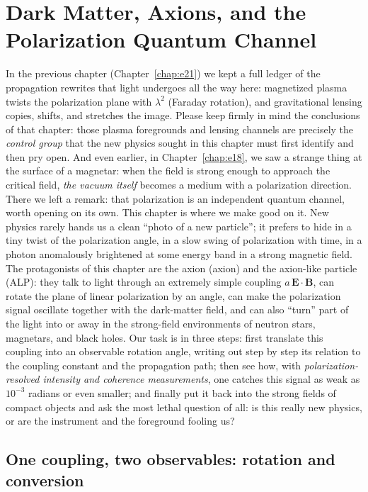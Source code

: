 \chapter{Dark Matter, Axions, and the Polarization Quantum Channel}
\label{chap:e22}

\begin{chapteropening}
In the previous chapter (Chapter~\ref{chap:e21}) we kept a full ledger of the propagation rewrites that light undergoes all the way here: magnetized plasma twists the polarization plane with \(\lambda^2\) (Faraday rotation), and gravitational lensing copies, shifts, and stretches the image. Please keep firmly in mind the conclusions of that chapter: those plasma foregrounds and lensing channels are precisely the \emph{control group} that the new physics sought in this chapter must first identify and then pry open. And even earlier, in Chapter~\ref{chap:e18}, we saw a strange thing at the surface of a magnetar: when the field is strong enough to approach the critical field, \emph{the vacuum itself} becomes a medium with a polarization direction. There we left a remark: that polarization is an independent quantum channel, worth opening on its own. This chapter is where we make good on it. New physics rarely hands us a clean ``photo of a new particle''; it prefers to hide in a tiny twist of the polarization angle, in a slow swing of polarization with time, in a photon anomalously brightened at some energy band in a strong magnetic field. The protagonists of this chapter are the axion (axion) and the axion-like particle (ALP): they talk to light through an extremely simple coupling \(a\,\bm E\cdot\bm B\), can rotate the plane of linear polarization by an angle, can make the polarization signal oscillate together with the dark-matter field, and can also ``turn'' part of the light into or away in the strong-field environments of neutron stars, magnetars, and black holes. Our task is in three steps: first translate this coupling into an observable rotation angle, writing out step by step its relation to the coupling constant and the propagation path; then see how, with \emph{polarization-resolved intensity and coherence measurements}, one catches this signal as weak as \(10^{-3}\) radians or even smaller; and finally put it back into the strong fields of compact objects and ask the most lethal question of all: is this really new physics, or are the instrument and the foreground fooling us?
\end{chapteropening}


\section{One coupling, two observables: rotation and conversion}
\label{sec:e22-coupling}

